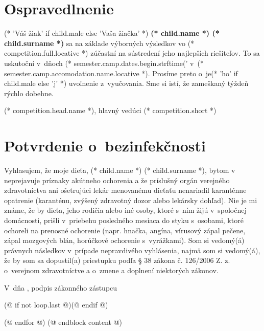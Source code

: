     \cutHere

    \section{Ospravedlnenie}
        (* 'Váš žiak' if child.male else 'Vaša žiačka' *) \textbf{(* child.name *) (* child.surname *)} sa na základe výborných výsledkov vo (* competition.full.locative *)
        zúčastní na sústredení jeho najlepších riešiteľov. To sa uskutoční v~dňoch (* semester.camp.dates.begin.strftime('%
        v~(* semester.camp.accomodation.name.locative *). Prosíme preto o~je(* 'ho' if child.male else 'j' *) uvoľnenie z~vyučovania.
        Sme si istí, že zameškaný týždeň rýchlo dobehne.
        \vspace{5mm}

        \hfill (* competition.head.name *), hlavný vedúci (* competition.short *)

    \cutHere

    \section{Potvrdenie o~bezinfekčnosti}
        Vyhlasujem, že moje dieťa, (* child.name *) (* child.surname *), bytom v~\makebox[30mm]{\dotfill} neprejavuje príznaky akútneho ochorenia a že
        príslušný orgán verejného zdravotníctva ani ošetrujúci lekár menovanému dieťaťu nenariadil
        karanténne opatrenie (karanténu, zvýšený zdravotný dozor alebo lekársky dohľad). Nie je mi známe, že
        by dieťa, jeho rodičia alebo iné osoby, ktoré s~ním žijú v~spoločnej domácnosti, prišli v~priebehu
        posledného mesiaca do styku s~osobami, ktoré ochoreli na prenosné ochorenie (napr. hnačka, angína,
        vírusový zápal pečene, zápal mozgových blán, horúčkové ochorenie s~vyrážkami). Som si
        vedomý(á) právnych následkov v~prípade nepravdivého vyhlásenia, najmä som si vedomý(á), že by som sa
        dopustil(a) priestupku podľa § 38 zákona č. 126/2006 Z. z. o~verejnom zdravotníctve a o~zmene a
        doplnení niektorých zákonov.
        \vspace{5mm}

        V~\dotfill dňa \dotfill, \hfill podpis zákonného zástupcu \dotfill

    (@ if not loop.last @)\newpage(@ endif @)

    (@ endfor @)
(@ endblock content @)
